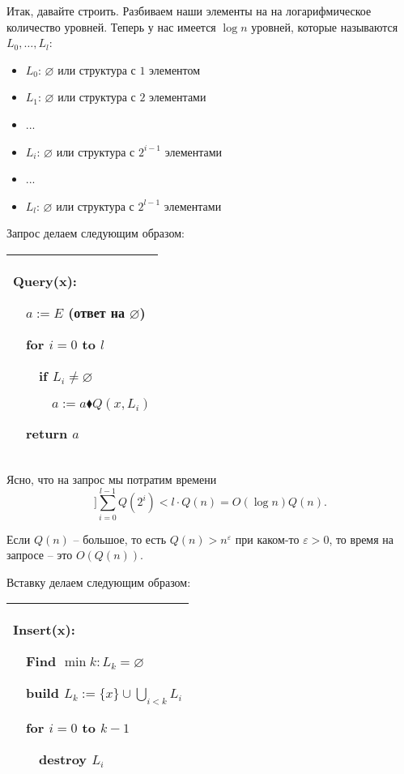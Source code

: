 Итак, давайте строить. Разбиваем наши элементы на на логарифмическое количество уровней. Теперь у нас имеется $\log n $ уровней, которые называются $L_0,\ldots,L_l$: \begin{itemize}
    \item $L_0$: $\varnothing$ или структура с $1$ элементом

    \item $L_1$: $\varnothing$ или структура с $2$ элементами

    \item ...

    \item $L_i$: $\varnothing$ или структура с $2^{i-1}$ элементами

    \item ...

    \item $L_l$: $\varnothing$ или структура с $2^{l-1}$ элементами

\end{itemize}

Запрос делаем следующим образом:

\begin{tabular}{|p{4cm}|}
    \hline
    Query(x):

    $\quad$$a:=E$ (ответ на $\varnothing$)

        $\quad$for $i=0$ to $l$

    $\quad$$\quad$if $L_i \ne \varnothing$

    $\quad$$\quad$$\quad$$a:=a\blacklozenge Q(x,L_i)$

    $\quad$return $a$ \\
    \hline
\end{tabular}


Ясно, что на запрос мы потратим времени \[]\sum_{i=0}^{l-1}Q(2^i)<l\cdot Q(n)=O(\log n)Q(n).\]

\begin{remark}
    Если $Q(n)$ -- большое, то есть $Q(n)>n^\varepsilon$ при каком-то $\varepsilon >0$, то время на запросе -- это $O(Q(n))$.
\end{remark}

Вставку делаем следующим образом:

\begin{tabular}{|p{5cm}|}
    \hline
    Insert(x):

    $\quad$Find $\min k: L_k=\varnothing$

    $\quad$build $L_k:=\{x\}\cup \bigcup_{i<k} L_i$

    $\quad$for $i=0$ to $k-1$

    $\quad$$\quad$destroy $L_i$ \\

    \hline
\end{tabular}

